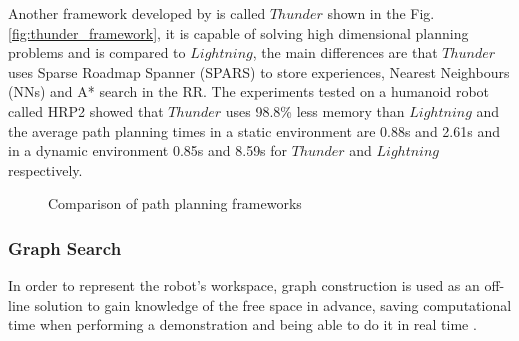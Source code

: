 \documentclass[thesis]{mas_proposal}
\begin{document}
    Another framework developed by \cite{Coleman2015} is called $Thunder$ shown in the Fig. \ref{fig:thunder_framework}, it is capable of solving high dimensional planning problems and is compared to $Lightning$, the main differences are that $Thunder$ uses Sparse Roadmap Spanner (SPARS) to store experiences, Nearest Neighbours (NNs) and A* search in the RR. The experiments tested on a humanoid robot called HRP2 showed that $Thunder$ uses 98.8\% less memory than $Lightning$ and the average path planning times in a static environment are 0.88s and 2.61s and in a dynamic environment 0.85s and 8.59s for $Thunder$ and $Lightning$ respectively.
    
    \begin{figure}[h]
    	\centering
    	\label{fig:related_frameworks}
    	\caption{Comparison of path planning frameworks}
    \end{figure}   
    
    \subsubsection{Graph Search}
    
    In order to represent the robot's workspace, graph construction is used as an off-line solution to gain knowledge of the free space in advance, saving computational time when performing a demonstration and being able to do it in real time \cite{Siegwart2011}. 
    
\end{document}

